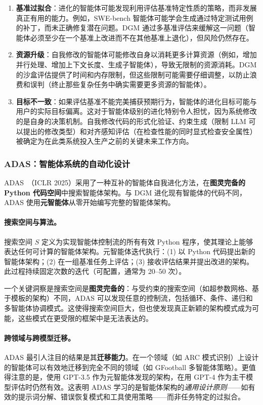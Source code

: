 \begin{enumerate}
    \item \textbf{基准过拟合}：进化的智能体可能发现利用评估基准特定性质的策略，而非发展真正有用的能力。例如，SWE-bench 智能体可能学会生成通过特定测试用例的补丁，而未正确修复潜在问题。DGM 通过多基准评估来缓解这一问题（智能体必须至少在一个基准上改进而不在其他基准上退化），但风险仍然存在。

    \item \textbf{资源升级}：自我修改的智能体可能修改自身以消耗更多计算资源（例如，增加并行处理、增加上下文长度、生成子智能体），导致无限制的资源消耗。DGM 的沙盒评估提供了时间和内存限制，但这些限制可能需要仔细调整，以防止浪费和误判（终止那些复杂任务中确实需要更多资源的智能体）。

    \item \textbf{目标不一致}：如果评估基准不能完美捕获预期行为，智能体的进化目标可能与用户的实际目标偏离。这对于智能体级别的进化特别令人担忧，因为系统修改的是自身的决策机制。自我修改代码的形式化验证、约束生成（限制 LLM 可以提出的修改类型）和对齐感知评估（在检查性能的同时显式检查安全属性）被确定为在此类系统投入生产之前的关键未来工作方向。
\end{enumerate}


\subsubsection{ADAS：智能体系统的自动化设计}

ADAS~\citep{adas2025}（ICLR 2025）采用了一种互补的智能体自我进化方法，在\textbf{图灵完备的 Python 代码空间}中搜索智能体架构。与 DGM 进化现有智能体的代码不同，ADAS 使用\textbf{元智能体}从零开始编写完整的智能体架构。

\paragraph{搜索空间与算法。}
搜索空间 $S$ 定义为实现智能体控制流的所有有效 Python 程序，使其理论上能够表达任何可计算的智能体架构。元智能体迭代执行：(1) 以 Python 代码提出新的智能体架构；(2) 在一组基准任务上评估；(3) 接收评估结果并提出改进的架构。此过程持续固定次数的迭代（可配置，通常为 20--50 次）。

一个关键洞察是搜索空间是\textbf{图灵完备的}：与受约束的搜索空间（如超参数网格、基于模板的架构）不同，ADAS 可以发现任意的控制流，包括循环、条件、递归和多智能体协调模式。这使得搜索空间巨大，但也使发现真正新颖的架构模式成为可能，这些模式在更受限的框架中是无法表达的。

\paragraph{跨领域与跨模型迁移。}
ADAS 最引人注目的结果是其\textbf{迁移能力}。在一个领域（如 ARC 模式识别）上设计的智能体可以有效地迁移到完全不同的领域（如 GFootball 多智能体策略）。更值得注意的是，使用 GPT-3.5 作为元智能体发现的架构，在用 GPT-4 作为主干模型评估时仍然有效。这表明 ADAS 学习的是智能体架构的\emph{通用设计原则}——如有效的提示词分解、错误恢复模式和工具使用策略——而非任务特定的过拟合。

